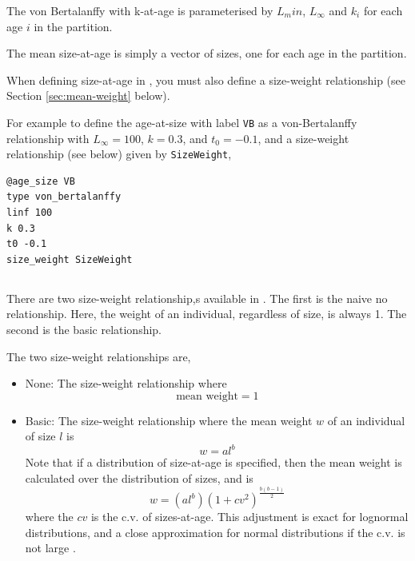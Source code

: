 The von Bertalanffy with k-at-age is parameterised by $L_min$, $L_\infty$ and $k_i$ for each age $i$ in the partition.

The mean size-at-age is simply a vector of sizes, one for each age in the partition.

When defining size-at-age in \SPM, you must also define a size-weight relationship (see Section \ref{sec:mean-weight} below).

For example to define the age-at-size with label \texttt{VB} as a von-Bertalanffy relationship with $L_\infty=100$, $k=0.3$, and $t_0=-0.1$, and a size-weight relationship (see below) given by \texttt{SizeWeight},

{\small{\begin{verbatim}
@age_size VB
type von_bertalanffy
linf 100
k 0.3
t0 -0.1
size_weight SizeWeight
\end{verbatim}}}

\subsection{\label{sec:mean-weight}}

There are two size-weight relationship,s available in \SPM. The first is the naive no relationship. Here, the weight of an individual, regardless of size, is always 1. The second is the basic relationship. 

The two size-weight relationships are,

\begin{itemize}
  \item{None:} The size-weight relationship where  
  \begin{equation}
    \text{mean weight}=1
  \end{equation}
  \item{Basic:} The size-weight relationship where the mean weight $w$ of an individual of size $l$ is
  \begin{equation}
    w=a l^b
  \end{equation}
	Note that if a distribution of size-at-age is specified, then the mean weight is calculated over the distribution of sizes, and is
  \begin{equation}
	  w=(al^b)(1+cv^2)^{\frac{b(b-1)}{2}}
  \end{equation}
	where the $cv$ is the c.v. of sizes-at-age. This adjustment is exact for lognormal distributions, and a close approximation for normal distributions if the c.v. is not large \citep{1388}.
\end{itemize}


